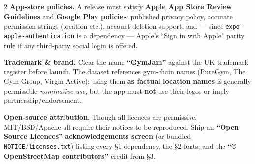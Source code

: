 \documentclass[a4paper,8pt]{extarticle}
\begin{document}
\begin{multicols}{2}
\smallskip
\textbf{App-store policies.} A release must satisfy \textbf{Apple App Store Review Guidelines} and \textbf{Google Play policies}: published privacy policy, accurate permission strings (location etc.), account-deletion support, and --- since \texttt{expo-apple-authentication} is a dependency --- Apple's ``Sign in with Apple'' parity rule if any third-party social login is offered.

\smallskip
\textbf{Trademark \& brand.} Clear the name \textbf{``GymJam''} against the UK trademark register before launch. The dataset references gym-chain names (PureGym, The Gym Group, Virgin Active); using them \textbf{as factual location names} is generally permissible \emph{nominative use}, but the app must \textbf{not} use their logos or imply partnership/endorsement.

\smallskip
\textbf{Open-source attribution.} Though all licences are permissive, MIT/BSD/Apache all require their notices to be reproduced. Ship an \textbf{``Open Source Licences'' acknowledgements screen} (or bundled \texttt{NOTICE}/\texttt{licenses.txt}) listing every \S1 dependency, the \S2 fonts, and the \textbf{``© OpenStreetMap contributors''} credit from \S3.

\end{multicols}
\end{document}
